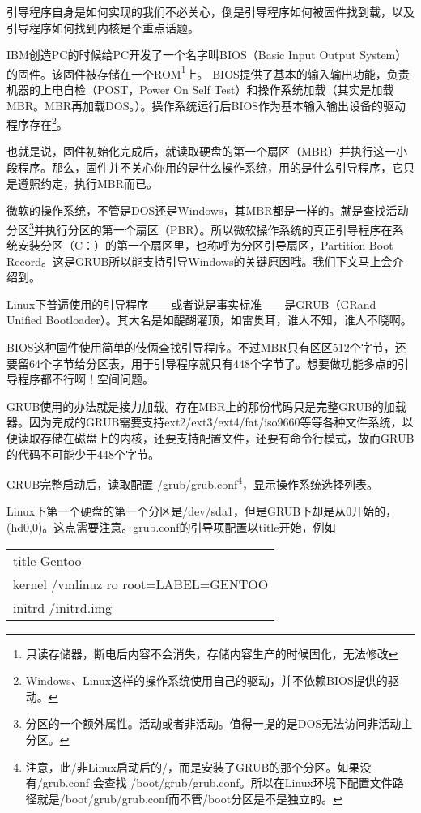 \documentclass[amstex,twoside]{ctexbook}
\newenvironment{code}{\small\tt\begin{longtable}{p{0.8\textwidth}}}{\end{longtable}}
\begin{document}
引导程序自身是如何实现的我们不必关心，倒是引导程序如何被固件找到载，以及引导程序如何找到内核是个重点话题。

IBM创造PC的时候给PC开发了一个名字叫BIOS（Basic Input Output System）的固件。该固件被存储在一个ROM\footnote{只读存储器，断电后内容不会消失，存储内容生产的时候固化，无法修改}上。 BIOS提供了基本的输入输出功能，负责机器的上电自检（POST，Power On Self Test）和操作系统加载（其实是加载MBR。MBR再加载DOS。）。操作系统运行后BIOS作为基本输入输出设备的驱动程序存在\footnote{Windows、Linux这样的操作系统使用自己的驱动，并不依赖BIOS提供的驱动。}。

也就是说，固件初始化完成后，就读取硬盘的第一个扇区（MBR）并执行这一小段程序。那么，固件并不关心你用的是什么操作系统，用的是什么引导程序，它只是遵照约定，执行MBR而已。

微软的操作系统，不管是DOS还是Windows，其MBR都是一样的。就是查找活动分区\footnote{分区的一个额外属性。活动或者非活动。值得一提的是DOS无法访问非活动主分区。}并执行分区的第一个扇区（PBR）。所以微软操作系统的真正引导程序在系统安装分区（C：）的第一个扇区里，也称呼为分区引导扇区，Partition Boot Record。这是GRUB所以能支持引导Windows的关键原因哦。我们下文马上会介绍到。

Linux下普遍使用的引导程序——或者说是事实标准——是GRUB（GRand Unified Bootloader）。其大名是如醍醐灌顶，如雷贯耳，谁人不知，谁人不晓啊。

BIOS这种固件使用简单的伎俩查找引导程序。不过MBR只有区区512个字节，还要留64个字节给分区表，用于引导程序就只有448个字节了。想要做功能多点的引导程序都不行啊！空间问题。

GRUB使用的办法就是接力加载。存在MBR上的那份代码只是完整GRUB的加载器。因为完成的GRUB需要支持ext2/ext3/ext4/fat/iso9660等等各种文件系统，以便读取存储在磁盘上的内核，还要支持配置文件，还要有命令行模式，故而GRUB的代码不可能少于448个字节。

GRUB完整启动后，读取配置 /grub/grub.conf\footnote{注意，此/非Linux启动后的/，而是安装了GRUB的那个分区。如果没有/grub.conf 会查找 /boot/grub/grub.conf。所以在Linux环境下配置文件路径就是/boot/grub/grub.conf而不管/boot分区是不是独立的。}，显示操作系统选择列表。

Linux下第一个硬盘的第一个分区是/dev/sda1，但是GRUB下却是从0开始的，(hd0,0)。这点需要注意。grub.conf的引导项配置以title开始，例如

\begin{code}
title Gentoo\\
kernel /vmlinuz ro root=LABEL=GENTOO\\
initrd /initrd.img
\end{code}
\end{document}

